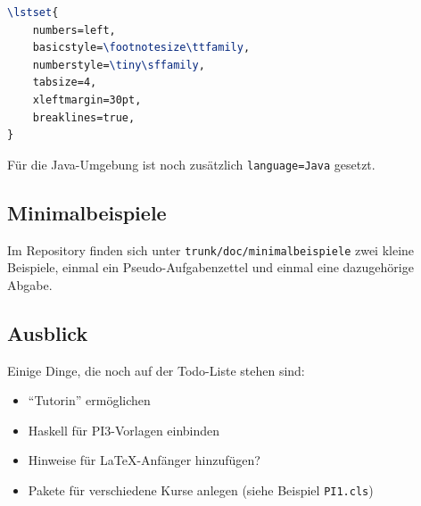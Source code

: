 \documentclass[nicefonts,nogruppe,nosemester,noveranstaltung,notutor,noabgabe,utf]{uhb-inf}
\begin{document}
\begin{lstlisting}[language=tex]
\lstset{
	numbers=left,
	basicstyle=\footnotesize\ttfamily,
	numberstyle=\tiny\sffamily,
	tabsize=4,
	xleftmargin=30pt,
	breaklines=true,
}
\end{lstlisting}

Für die Java-Umgebung ist noch zusätzlich \texttt{language=Java} gesetzt.

\subsection{Minimalbeispiele}

Im Repository finden sich unter \texttt{trunk/doc/minimalbeispiele} zwei kleine Beispiele, einmal ein Pseudo-Aufgabenzettel und einmal eine dazugehörige Abgabe.

\subsection{Ausblick}

Einige Dinge, die noch auf der Todo-Liste stehen sind:

\begin{itemize}
	\item "`Tutorin"' ermöglichen
	\item Haskell für PI3-Vorlagen einbinden
	\item Hinweise für \LaTeX-Anfänger hinzufügen?
	\item Pakete für verschiedene Kurse anlegen (siehe Beispiel \texttt{PI1.cls})
\end{itemize}
\end{document}
